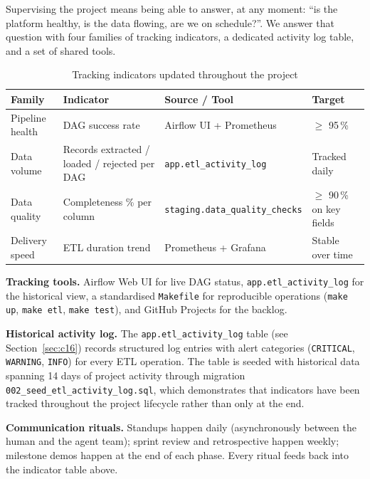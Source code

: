 \documentclass[a4paper,11pt,oneside,openany]{report}
\begin{document}
Supervising the project means being able to answer, at any moment:
``is the platform healthy, is the data flowing, are we on
schedule?''. We answer that question with four families of
tracking indicators, a dedicated activity log table, and a set of
shared tools.

\begin{table}[H]
\centering
\caption{Tracking indicators updated throughout the project}
\label{tab:tracking}
\begin{tabularx}{\textwidth}{L{3cm} L{4cm} L{4cm} L{3cm}}
\toprule
\textbf{Family} & \textbf{Indicator} & \textbf{Source / Tool} & \textbf{Target} \\
\midrule
Pipeline health & DAG success rate & Airflow UI + Prometheus & $\geq$ 95\,\% \\
Data volume & Records extracted / loaded / rejected per DAG & \texttt{app.etl\_activity\_log} & Tracked daily \\
Data quality & Completeness \% per column & \texttt{staging.data\_quality\_checks} & $\geq$ 90\,\% on key fields \\
Delivery speed & ETL duration trend & Prometheus + Grafana & Stable over time \\
\bottomrule
\end{tabularx}
\end{table}

\textbf{Tracking tools.} Airflow Web UI for live DAG status,
\texttt{app.etl\_activity\_log} for the historical view, a
standardised \texttt{Makefile} for reproducible operations
(\texttt{make up}, \texttt{make etl}, \texttt{make test}), and
GitHub Projects for the backlog.

\textbf{Historical activity log.} The
\texttt{app.etl\_activity\_log} table (see
Section~\ref{sec:c16}) records structured log entries with alert
categories (\texttt{CRITICAL}, \texttt{WARNING}, \texttt{INFO}) for
every ETL operation. The table is seeded with historical data
spanning 14 days of project activity through migration
\texttt{002\_seed\_etl\_activity\_log.sql}, which demonstrates
that indicators have been tracked throughout the project
lifecycle rather than only at the end.

\textbf{Communication rituals.} Standups happen daily
(asynchronously between the human and the agent team); sprint
review and retrospective happen weekly; milestone demos happen at
the end of each phase. Every ritual feeds back into the indicator
table above.


\end{document}
